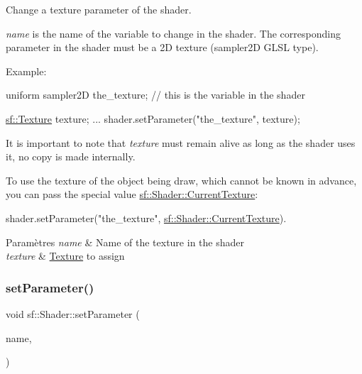 Change a texture parameter of the shader. 

{\itshape name} is the name of the variable to change in the shader. The corresponding parameter in the shader must be a 2D texture (sampler2D G\+L\+SL type).

Example\+: 
\begin{DoxyCode}
uniform sampler2D the\_texture; \textcolor{comment}{// this is the variable in the shader}
\end{DoxyCode}
 
\begin{DoxyCode}
\hyperlink{classsf_1_1Texture}{sf::Texture} texture;
...
shader.setParameter(\textcolor{stringliteral}{"the\_texture"}, texture);
\end{DoxyCode}
 It is important to note that {\itshape texture} must remain alive as long as the shader uses it, no copy is made internally.

To use the texture of the object being draw, which cannot be known in advance, you can pass the special value \hyperlink{classsf_1_1Shader_ac84c7953eec2e19358ea6e2cc5385b8d}{sf\+::\+Shader\+::\+Current\+Texture}\+: 
\begin{DoxyCode}
shader.setParameter(\textcolor{stringliteral}{"the\_texture"}, \hyperlink{classsf_1_1Shader_ac84c7953eec2e19358ea6e2cc5385b8d}{sf::Shader::CurrentTexture}).
\end{DoxyCode}



\begin{DoxyParams}{Paramètres}
{\em name} & Name of the texture in the shader \\
\hline
{\em texture} & \hyperlink{classsf_1_1Texture}{Texture} to assign \\
\hline
\end{DoxyParams}
\mbox{\label{classsf_1_1Shader_af06b4cba0bab915fa01032b063909044}} 
\subsubsection{\texorpdfstring{set\+Parameter()}{setParameter()}\hspace{0.1cm}{\footnotesize\ttfamily [10/10]}}
{\footnotesize\ttfamily void sf\+::\+Shader\+::set\+Parameter (\begin{DoxyParamCaption}\item[{const std\+::string \&}]{name,  }\item[{\hyperlink{structsf_1_1Shader_1_1CurrentTextureType}{Current\+Texture\+Type}}]{ }\end{DoxyParamCaption})}



